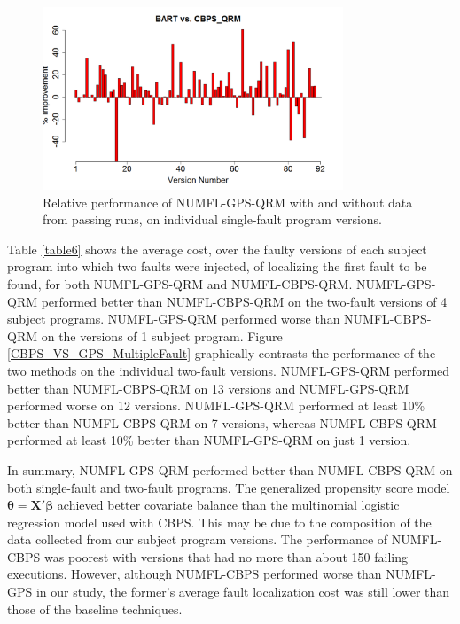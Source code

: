 \begin{figure}[!thpb]
\centering
\includegraphics[width=0.8\textwidth]{chapter4_BARTvsCBPS.pdf}
\caption{Relative performance of NUMFL-GPS-QRM with and without data from passing runs, on individual single-fault program versions.}
\label{BARTvsCBPS}
\end{figure}

Table \ref{table6} shows the average cost, over the faulty versions of each subject program into which two faults were injected, of localizing the first fault to be found, for both NUMFL-GPS-QRM and NUMFL-CBPS-QRM.  NUMFL-GPS-QRM performed better than NUMFL-CBPS-QRM on the two-fault versions of 4 subject programs. NUMFL-GPS-QRM performed worse than NUMFL-CBPS-QRM on the versions of 1 subject program.  Figure \ref{CBPS_VS_GPS_MultipleFault} graphically contrasts the performance of the two methods on the individual two-fault versions.  NUMFL-GPS-QRM performed better than NUMFL-CBPS-QRM on 13 versions and NUMFL-GPS-QRM performed worse on 12 versions.  NUMFL-GPS-QRM performed at least 10\% better than NUMFL-CBPS-QRM on 7 versions, whereas NUMFL-CBPS-QRM performed at least 10\% better than NUMFL-GPS-QRM on just 1 version.

In summary, NUMFL-GPS-QRM performed better than NUMFL-CBPS-QRM on both single-fault and two-fault programs.  The generalized propensity score model $\pmb{\theta}=\pmb{X}'\pmb{\beta}$ achieved better covariate balance than the multinomial logistic regression model used with CBPS.  This may be due to the composition of the data collected from our subject program versions.  The performance of NUMFL-CBPS was poorest with versions that had no more than about 150 failing executions.  However, although NUMFL-CBPS performed worse than NUMFL-GPS in our study, the former's average fault localization cost was still lower than those of the baseline techniques.

